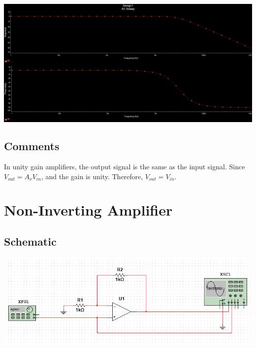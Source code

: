 \documentclass[a4paper, 12pt, english]{article}
\newenvironment{Figure}
  {\par\medskip\noindent\minipage{\linewidth}}
  {\endminipage\par\medskip}
\begin{document}
\begin{Figure}
 \centering
 \includegraphics[width=\linewidth, scale=2]{images/unityFrequencyResponseSin.png}
\end{Figure}

\subsection{Comments}
In unity gain amplifiers, the output signal is the same as the input signal. Since \( V_{out} = A_{\nu}V_{in} \), and the gain is unity. Therefore, \( V_{out} = V_{in} \).

\newpage
\section{Non-Inverting Amplifier}
\subsection{Schematic}
\begin{Figure}
 \centering
 \includegraphics[width=1.2\linewidth, scale=2]{images/nonInvertingSchematic.png}
\end{Figure}
\end{document}
